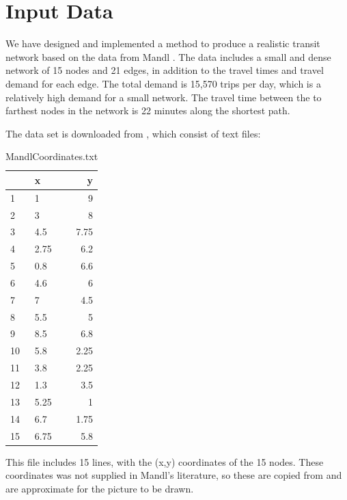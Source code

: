 \section{Input Data}

We have designed and implemented a method to produce a realistic transit network based on the data from Mandl \citep{mandl79}. The data includes a small and dense network of 15 nodes and 21 edges, in addition to the travel times and travel demand for each edge. The total demand is 15,570 trips per day, which is a relatively high demand for a small network. The travel time between the to farthest nodes in the network is 22 minutes along the shortest path. 

The data set is downloaded from \citet{mumford13}, which consist of text files:

\begin{table}[H]
    \begin{center}
        \begin{tabular}{|l|lr|}
     	\hline
     	~ & x & y \\
     	\hline
        1 & 1 & 9 \\
        2 & 3 & 8 \\
        3 & 4.5 & 7.75 \\
        4 & 2.75 & 6.2 \\
        5 & 0.8 & 6.6 \\
        6 & 4.6 & 6 \\
        7 & 7 & 4.5 \\
        8 & 5.5 & 5 \\
        9 & 8.5 & 6.8 \\
        10 & 5.8 & 2.25 \\
        11 & 3.8 & 2.25 \\
        12 & 1.3 & 3.5 \\
    	13 & 5.25 & 1 \\
    	14 & 6.7 & 1.75 \\
    	15 & 6.75 & 5.8 \\
    	\hline
        \end{tabular}
    \end{center}
    \caption {MandlCoordinates.txt}
    \label{table:MandlCoords}
    This file includes 15 lines, with the (x,y) coordinates of the 15 nodes. These coordinates was not supplied in Mandl's literature, so these are copied from \citet{mumford13} and are approximate for the picture to be drawn.
\end{table}

